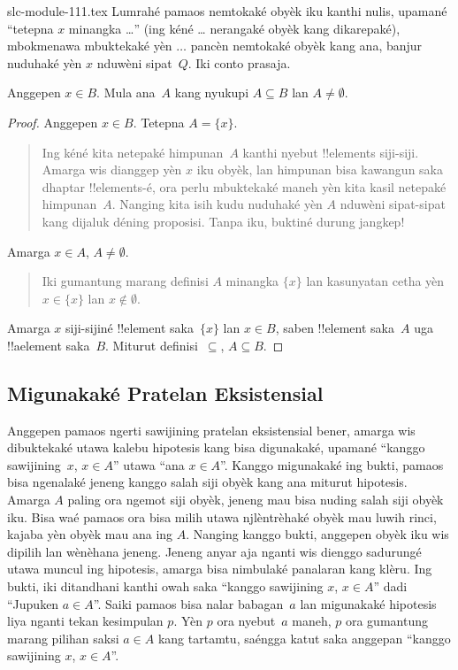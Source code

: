 \begin{filecontents*}[overwrite]{slc-module-111.tex}
Lumrahé pamaos nemtokaké obyèk iku kanthi nulis,
upamané ``tetepna $x$ minangka \dots'' (ing kéné \dots{}
nerangaké obyèk kang dikarepaké), mbokmenawa mbuktekaké
yèn $\dots$ pancèn nemtokaké obyèk kang ana, banjur nuduhaké
yèn $x$ nduwèni sipat~$Q$. Iki conto prasaja.

\begin{prop}
  Anggepen $x \in B$. Mula ana~$A$ kang nyukupi
  $A \subseteq B$ lan $A \neq \emptyset$.
\end{prop}

\begin{proof}
  Anggepen $x \in B$. Tetepna $A = \{x\}$.
  \begin{quote}
    Ing kéné kita netepaké himpunan~$A$ kanthi nyebut
    !!{element}s siji-siji. Amarga wis dianggep yèn $x$ iku obyèk,
    lan himpunan bisa kawangun saka dhaptar !!{element}s-é,
    ora perlu mbuktekaké maneh yèn kita kasil netepaké
    himpunan~$A$. Nanging kita isih kudu nuduhaké yèn $A$
    nduwèni sipat-sipat kang dijaluk déning proposisi.
    Tanpa iku, buktiné durung jangkep!{}
  \end{quote}
  Amarga $x \in A$, $A \neq \emptyset$.
  \begin{quote}
    Iki gumantung marang definisi $A$ minangka $\{x\}$ lan
    kasunyatan cetha yèn $x \in \{x\}$ lan $x \notin \emptyset$.
  \end{quote}
  Amarga $x$ siji-sijiné !!{element} saka~$\{x\}$ lan
  $x \in B$, saben !!{element} saka~$A$ uga !!a{element}
  saka~$B$. Miturut definisi~$\subseteq$, $A \subseteq B$.
\end{proof}

\subsection{Migunakaké Pratelan Eksistensial}

Anggepen pamaos ngerti sawijining pratelan eksistensial
bener, amarga wis dibuktekaké utawa kalebu hipotesis kang bisa
digunakaké, upamané ``kanggo sawijining~$x$, $x \in A$'' utawa
``ana $x \in A$''. Kanggo migunakaké ing bukti, pamaos
bisa ngenalaké jeneng kanggo salah siji obyèk kang ana miturut
hipotesis. Amarga $A$ paling ora ngemot siji obyèk, jeneng mau
bisa nuding salah siji obyèk iku. Bisa waé pamaos ora bisa
milih utawa njlèntrèhaké obyèk mau luwih rinci, kajaba yèn
obyèk mau ana ing $A$. Nanging kanggo bukti, anggepen obyèk
iku wis dipilih lan wènèhana jeneng. Jeneng anyar aja nganti
wis dienggo sadurungé utawa muncul ing hipotesis, amarga bisa
nimbulaké panalaran kang klèru. Ing bukti, iki ditandhani
kanthi owah saka ``kanggo sawijining $x$, $x \in A$'' dadi
``Jupuken $a \in A$''. Saiki pamaos bisa nalar babagan~$a$
lan migunakaké hipotesis liya nganti tekan kesimpulan $p$.
Yèn $p$ ora nyebut~$a$ maneh, $p$ ora gumantung
marang pilihan saksi $a \in A$ kang tartamtu,
saéngga katut saka anggepan
``kanggo sawijining $x$, $x \in A$''.



\end{filecontents*}
